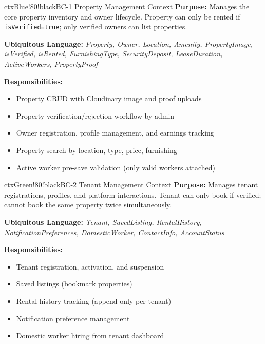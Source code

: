 \documentclass[12pt,a4paper]{article}
\begin{document}
\begin{contextbox}{ctxBlue!80!black}{BC-1 \quad Property Management Context}
\textbf{Purpose:} Manages the core property inventory and owner lifecycle. Property can only be rented if \texttt{isVerified=true}; only verified owners can list properties.

\textbf{Ubiquitous Language:} \textit{Property, Owner, Location, Amenity, PropertyImage, isVerified, isRented, FurnishingType, SecurityDeposit, LeaseDuration, ActiveWorkers, PropertyProof}

\textbf{Responsibilities:}
\begin{itemize}
  \item Property CRUD with Cloudinary image and proof uploads
  \item Property verification/rejection workflow by admin
  \item Owner registration, profile management, and earnings tracking
  \item Property search by location, type, price, furnishing
  \item Active worker pre-save validation (only valid workers attached)
\end{itemize}
\end{contextbox}

\vspace{0.5em}

\begin{contextbox}{ctxGreen!80!black}{BC-2 \quad Tenant Management Context}
\textbf{Purpose:} Manages tenant registrations, profiles, and platform interactions. Tenant can only book if verified; cannot book the same property twice simultaneously.

\textbf{Ubiquitous Language:} \textit{Tenant, SavedListing, RentalHistory, NotificationPreferences, DomesticWorker, ContactInfo, AccountStatus}

\textbf{Responsibilities:}
\begin{itemize}
  \item Tenant registration, activation, and suspension
  \item Saved listings (bookmark properties)
  \item Rental history tracking (append-only per tenant)
  \item Notification preference management
  \item Domestic worker hiring from tenant dashboard
\end{itemize}
\end{contextbox}
\end{document}
